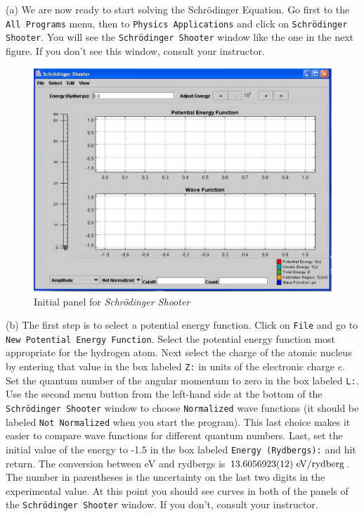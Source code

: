 (a) We are now ready to start solving the Schr\"odinger Equation.
Go first to the {\tt All Programs} menu, then
to {\tt Physics Applications} and click on {\tt Schr\"odinger Shooter}.
You will see the {\tt Schr\"odinger Shooter} window like the one in the next figure.
If you don't see this window, consult your instructor.
\begin{figure}[hbt]
\begin{center}
\includegraphics[width=6.0in]{solveSE/shooter1b.pdf}
\caption{Initial panel for {\it Schr\"odinger Shooter}}
\end{center}
\end{figure}

(b) The first step is to select a potential energy function.
Click on {\tt File} and go to {\tt New Potential Energy Function}.
Select the potential energy function most appropriate for the hydrogen atom.
Next select the charge of the atomic nucleus by entering that value in the 
box labeled {\tt Z:} in units of the electronic charge $e$.
Set the quantum number of the angular momentum to zero in the box
labeled {\tt L:}.
Use the second menu button from the left-hand side 
at the bottom of the {\tt Schr\"odinger Shooter}
window to choose {\tt Normalized} wave functions (it should be labeled {\tt Not Normalized}
when you start the program).
This last choice makes it easier to compare wave functions for different quantum numbers.
Last, set the initial value of the energy to -1.5 in the box labeled 
{\tt Energy (Rydbergs):} and hit return.
The conversion between eV and rydbergs is $\rm 13.605 6923(12)~ eV/rydberg$.
The number in parentheses is the uncertainty on the last two digits in the
experimental value.
At this point you should see curves in both of the panels of the 
{\tt Schr\"odinger Shooter} window.
If you don't, consult your instructor.

